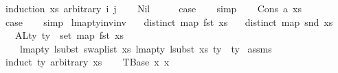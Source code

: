 \begin{isabellebody}
%
\isadelimproof
%
\endisadelimproof
%
\isatagproof
{}\isamarkupfalse%
\ {\isacharparenleft}{\kern0pt}induction\ xs\ arbitrary{\isacharcolon}{\kern0pt}\ i\ j{\isacharparenright}{\kern0pt}\isanewline
\ \ \isamarkupfalse%
\ Nil\isanewline
\ \ \isamarkupfalse%
\ \isamarkupfalse%
\ {\isacharquery}{\kern0pt}case\isanewline
\ \ \isamarkupfalse%
\ simp\isanewline
{}\isamarkupfalse%
\isanewline
\ \ \isamarkupfalse%
\ {\isacharparenleft}{\kern0pt}Cons\ a\ xs{\isacharparenright}{\kern0pt}\isanewline
\ \ \isamarkupfalse%
\ \isamarkupfalse%
\ {\isacharquery}{\kern0pt}case\isanewline
\ \ \isamarkupfalse%
\ simp\isanewline
{}\isamarkupfalse%
%
\endisatagproof
{\isafoldproof}%
%
\isadelimproof
\isanewline
%
\endisadelimproof
\isanewline
\isanewline
\isanewline
\isanewline
\isanewline
\isanewline
{}\isamarkupfalse%
\ lmap{\isacharunderscore}{\kern0pt}ty{\isacharunderscore}{\kern0pt}inv{\isacharunderscore}{\kern0pt}inv{\isacharcolon}{\kern0pt}\isanewline
\ \ \ {\isachardoublequoteopen}distinct\ {\isacharparenleft}{\kern0pt}map\ fst\ xs{\isacharparenright}{\kern0pt}{\isachardoublequoteclose}\isanewline
\ \ \ {\isachardoublequoteopen}distinct\ {\isacharparenleft}{\kern0pt}map\ snd\ xs{\isacharparenright}{\kern0pt}{\isachardoublequoteclose}\isanewline
\ \ \ {\isachardoublequoteopen}ALty\ ty\ {\isasymsubseteq}\ set\ {\isacharparenleft}{\kern0pt}map\ fst\ xs{\isacharparenright}{\kern0pt}{\isachardoublequoteclose}\isanewline
\ \ \ \ {\isachardoublequoteopen}lmap{\isacharunderscore}{\kern0pt}ty\ {\isacharparenleft}{\kern0pt}lsubst\ {\isacharparenleft}{\kern0pt}swap{\isacharunderscore}{\kern0pt}list\ xs{\isacharparenright}{\kern0pt}{\isacharparenright}{\kern0pt}\ {\isacharparenleft}{\kern0pt}lmap{\isacharunderscore}{\kern0pt}ty\ {\isacharparenleft}{\kern0pt}lsubst\ xs{\isacharparenright}{\kern0pt}\ ty{\isacharparenright}{\kern0pt}\ {\isacharequal}{\kern0pt}\ ty{\isachardoublequoteclose}\isanewline
%
\isadelimproof
%
\endisadelimproof
%
\isatagproof
{}\isamarkupfalse%
\ assms\isanewline
{}\isamarkupfalse%
\ {\isacharparenleft}{\kern0pt}induct\ ty\ arbitrary{\isacharcolon}{\kern0pt}\ xs{\isacharparenright}{\kern0pt}\isanewline
\ \ \isamarkupfalse%
\ {\isacharparenleft}{\kern0pt}TBase\ x{}\ x{}{\isacharparenright}{\kern0pt}\isanewline

\end{isabellebody}
